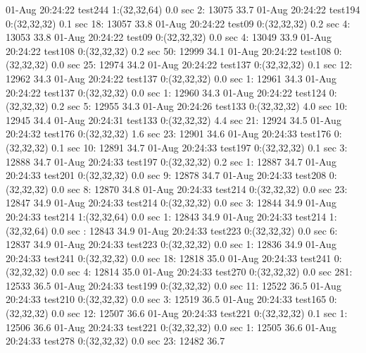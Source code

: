 01-Aug 20:24:22 test244     1:(32,32,64)     0.0 sec    2: 13075 33.7%
01-Aug 20:24:22 test194     0:(32,32,32)     0.1 sec   18: 13057 33.8%
01-Aug 20:24:22 test09      0:(32,32,32)     0.2 sec    4: 13053 33.8%
01-Aug 20:24:22 test09      0:(32,32,32)     0.0 sec    4: 13049 33.9%
01-Aug 20:24:22 test108     0:(32,32,32)     0.2 sec   50: 12999 34.1%
01-Aug 20:24:22 test108     0:(32,32,32)     0.0 sec   25: 12974 34.2%
01-Aug 20:24:22 test137     0:(32,32,32)     0.1 sec   12: 12962 34.3%
01-Aug 20:24:22 test137     0:(32,32,32)     0.0 sec    1: 12961 34.3%
01-Aug 20:24:22 test137     0:(32,32,32)     0.0 sec    1: 12960 34.3%
01-Aug 20:24:22 test124     0:(32,32,32)     0.2 sec    5: 12955 34.3%
01-Aug 20:24:26 test133     0:(32,32,32)     4.0 sec   10: 12945 34.4%
01-Aug 20:24:31 test133     0:(32,32,32)     4.4 sec   21: 12924 34.5%
01-Aug 20:24:32 test176     0:(32,32,32)     1.6 sec   23: 12901 34.6%
01-Aug 20:24:33 test176     0:(32,32,32)     0.1 sec   10: 12891 34.7%
01-Aug 20:24:33 test197     0:(32,32,32)     0.1 sec    3: 12888 34.7%
01-Aug 20:24:33 test197     0:(32,32,32)     0.2 sec    1: 12887 34.7%
01-Aug 20:24:33 test201     0:(32,32,32)     0.0 sec    9: 12878 34.7%
01-Aug 20:24:33 test208     0:(32,32,32)     0.0 sec    8: 12870 34.8%
01-Aug 20:24:33 test214     0:(32,32,32)     0.0 sec   23: 12847 34.9%
01-Aug 20:24:33 test214     0:(32,32,32)     0.0 sec    3: 12844 34.9%
01-Aug 20:24:33 test214     1:(32,32,64)     0.0 sec    1: 12843 34.9%
01-Aug 20:24:33 test214     1:(32,32,64)     0.0 sec     : 12843 34.9%
01-Aug 20:24:33 test223     0:(32,32,32)     0.0 sec    6: 12837 34.9%
01-Aug 20:24:33 test223     0:(32,32,32)     0.0 sec    1: 12836 34.9%
01-Aug 20:24:33 test241     0:(32,32,32)     0.0 sec   18: 12818 35.0%
01-Aug 20:24:33 test241     0:(32,32,32)     0.0 sec    4: 12814 35.0%
01-Aug 20:24:33 test270     0:(32,32,32)     0.0 sec  281: 12533 36.5%
01-Aug 20:24:33 test199     0:(32,32,32)     0.0 sec   11: 12522 36.5%
01-Aug 20:24:33 test210     0:(32,32,32)     0.0 sec    3: 12519 36.5%
01-Aug 20:24:33 test165     0:(32,32,32)     0.0 sec   12: 12507 36.6%
01-Aug 20:24:33 test221     0:(32,32,32)     0.1 sec    1: 12506 36.6%
01-Aug 20:24:33 test221     0:(32,32,32)     0.0 sec    1: 12505 36.6%
01-Aug 20:24:33 test278     0:(32,32,32)     0.0 sec   23: 12482 36.7%
